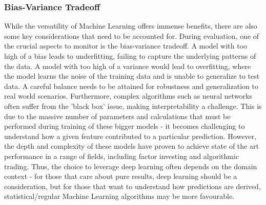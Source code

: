 \documentclass[a4paper]{report}
\begin{document}
\subsubsection{Bias-Variance Tradeoff}
While the versatility of Machine Learning offers immense benefits, there
are also some key considerations that need to be accounted for. During evaluation, one of the crucial aspects to monitor is the bias-variance tradeoff. A model with too high of a bias leads to underfitting, failing 
to capture the underlying patterns of the data. A model with too high of a variance would lead to overfitting, where the model learns the noise of the training data and 
is unable to generalize to test data. A careful balance needs to be attained for robustness and generalization to real world scenarios. Furthermore, complex algorithms such as neural networks often suffer from the 'black box'
issue, making interpretability a challenge. This is due to the massive number of parameters and calculations that must be performed during training of these bigger models - it becomes challenging to understand 
how a given feature contributed to a particular prediction. However, the depth and complexity of these models have proven to achieve state of the art performance in a range of fields, including factor investing and algorithmic trading. Thus, 
the choice to leverage deep learning often depends on the domain context - for those that care about pure results, deep learning should be a consideration, but for those that want to understand how predictions are derived, statistical/regular 
Machine Learning algorithms may be more favourable.
\end{document}
